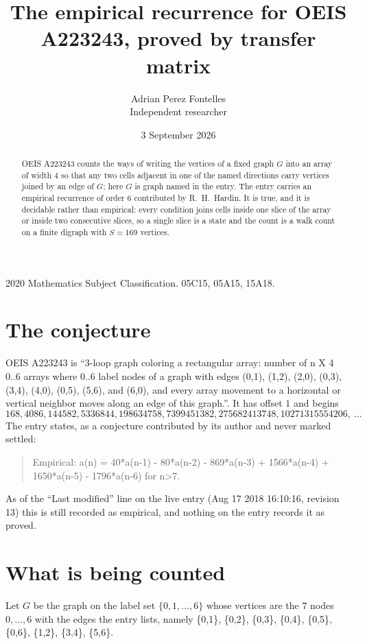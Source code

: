 \documentclass[11pt,a4paper]{article}
\title{The empirical recurrence for OEIS A223243, proved by transfer matrix}
\author{Adrian Perez Fontelles\\ \small Independent researcher}
\date{3 September 2026}
\theoremstyle{plain}
\theoremstyle{definition}
\begin{document}
\maketitle

\begin{abstract}
OEIS A223243 counts the ways of writing the vertices of a fixed graph $G$ into an array of width
$4$ so that any two cells adjacent in one of the named directions carry vertices joined by an
edge of $G$; here $G$ is graph named in the entry. The entry carries an empirical recurrence of order $6$
contributed by R.~H.~Hardin. It is true, and it is decidable rather than empirical: every
condition joins cells inside one slice of the array or inside two consecutive slices, so a
single slice is a state and the count is a walk count on a finite digraph with $S=169$ vertices.
\end{abstract}

\noindent\small 2020 Mathematics Subject Classification. 05C15, 05A15, 15A18.\normalsize

\section{The conjecture}

OEIS A223243 is ``3-loop graph coloring a rectangular array: number of n X 4 0..6 arrays where 0..6 label nodes of a graph with edges (0,1), (1,2), (2,0), (0,3), (3,4), (4,0), (0,5), (5,6), and (6,0), and every array movement to a horizontal or vertical neighbor moves along an edge of this graph.''. It has offset $1$ and begins
\[
168, 4086, 144582, 5336844, 198634758, 7399451382, 275682413748, 10271315554206,\ \dots
\]
The entry states, as a conjecture contributed by its author and never marked settled:
\begin{quote}
Empirical: a(n) = 40*a(n-1) - 80*a(n-2) - 869*a(n-3) + 1566*a(n-4) + 1650*a(n-5) - 1796*a(n-6) for n>7.
\end{quote}
As of the ``Last modified'' line on the live entry (Aug 17 2018 16:10:16, revision 13) this is still
recorded as empirical, and nothing on the entry records it as proved.

\section{What is being counted}

Let $G$ be the graph on the label set $\{0,1,\dots,6\}$ whose vertices are the $7$ nodes $0,\dots,6$ with the edges the entry lists, namely \{0,1\}, \{0,2\}, \{0,3\}, \{0,4\}, \{0,5\}, \{0,6\}, \{1,2\}, \{3,4\}, \{5,6\}.
\end{document}
